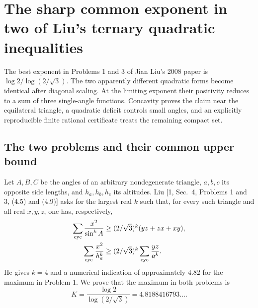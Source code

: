 \documentclass[11pt,a4paper]{article}
\numberwithin{equation}{section}
\theoremstyle{definition}
\theoremstyle{remark}
\newenvironment{sectionabstract}{\par\smallskip\begingroup\small\noindent}{\par\endgroup\medskip}
\begin{document}
\par\endgroup

\begingroup

\section{\texorpdfstring{The sharp common exponent in two of Liu's ternary quadratic inequalities}{The sharp common exponent in two of Liu's ternary quadratic inequalities}}\label{section:r40showa}
\par\medskip


\begin{sectionabstract}
The best exponent in Problems 1 and 3 of Jian Liu's 2008 paper is
$\log 2/\log(2/\sqrt3)$. The two apparently different quadratic forms become identical after diagonal scaling. At the limiting exponent their positivity reduces to a sum of three single-angle functions. Concavity proves the claim near the equilateral triangle, a quadratic deficit controls small angles, and an explicitly reproducible finite rational certificate treats the remaining compact set.
\end{sectionabstract}

\subsection{The two problems and their common upper bound}
Let $A,B,C$ be the angles of an arbitrary nondegenerate triangle, $a,b,c$ its opposite side lengths, and $h_a,h_b,h_c$ its altitudes. Liu [1, Sec.~4, Problems 1 and 3, (4.5) and (4.9)] asks for the largest real $k$ such that, for every such triangle and all real $x,y,z$, one has, respectively,
\begin{align}
 \sum_{\rm cyc}\frac{x^2}{\sin^k A}&\ge
 (2/\sqrt3)^k(yz+zx+xy),\label{r40showa:e1}\\
 \sum_{\rm cyc}\frac{x^2}{h_a^k}&\ge
 (2/\sqrt3)^k\sum_{\rm cyc}\frac{yz}{a^k}.\label{r40showa:e2}
\end{align}
He gives $k=4$ and a numerical indication of approximately $4.82$ for the maximum in Problem 1. We prove that the maximum in both problems is
\[
 K=\frac{\log 2}{\log(2/\sqrt3)}=4.8188416793\ldots .
\]
\end{document}
